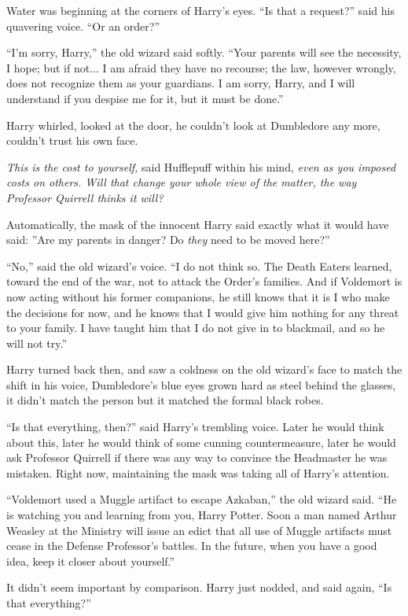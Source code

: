 Water was beginning at the corners of Harry's eyes. ``Is that a
request?'' said his quavering voice. ``Or an order?''

``I'm sorry, Harry,'' the old wizard said softly. ``Your parents will
see the necessity, I hope; but if not... I am afraid they have no
recourse; the law, however wrongly, does not recognize them as your
guardians. I am sorry, Harry, and I will understand if you despise me
for it, but it must be done.''

Harry whirled, looked at the door, he couldn't look at Dumbledore any
more, couldn't trust his own face.

\emph{This is the cost to yourself,} said Hufflepuff within his mind,
\emph{even as you imposed costs on others. Will that change your whole
view of the matter, the way Professor Quirrell thinks it will?}

Automatically, the mask of the innocent Harry said exactly what it would
have said: ''Are my parents in danger? Do \emph{they} need to be moved
here?''

``No,'' said the old wizard's voice. ``I do not think so. The Death
Eaters learned, toward the end of the war, not to attack the Order's
families. And if Voldemort is now acting without his former companions,
he still knows that it is I who make the decisions for now, and he knows
that I would give him nothing for any threat to your family. I have
taught him that I do not give in to blackmail, and so he will not try.''

Harry turned back then, and saw a coldness on the old wizard's face to
match the shift in his voice, Dumbledore's blue eyes grown hard as steel
behind the glasses, it didn't match the person but it matched the formal
black robes.

``Is that everything, then?'' said Harry's trembling voice. Later he
would think about this, later he would think of some cunning
countermeasure, later he would ask Professor Quirrell if there was any
way to convince the Headmaster he was mistaken. Right now, maintaining
the mask was taking all of Harry's attention.

``Voldemort used a Muggle artifact to escape Azkaban,'' the old wizard
said. ``He is watching you and learning from you, Harry Potter. Soon a
man named Arthur Weasley at the Ministry will issue an edict that all
use of Muggle artifacts must cease in the Defense Professor's battles.
In the future, when you have a good idea, keep it closer about
yourself.''

It didn't seem important by comparison. Harry just nodded, and said
again, ``Is that everything?''

